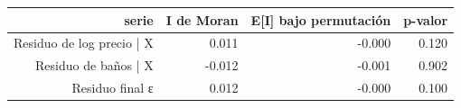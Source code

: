 \begin{tabular}{rrrr}
\toprule
serie & I de Moran & E[I] bajo permutación & p-valor \\
\midrule
Residuo de log precio | X & 0.011 & -0.000 & 0.120 \\
Residuo de baños | X & -0.012 & -0.001 & 0.902 \\
Residuo final ε & 0.012 & -0.000 & 0.100 \\
\bottomrule
\end{tabular}